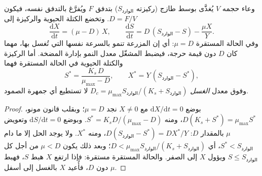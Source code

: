 \begin{theorem}\label{thm:b2:microbial-metabolism:chemostat}
\emph{} وعاء حجمه $V$ يُغذَّى بوسط طازج
(ركيزته $S_{\text{الوارد}}$) بتدفق $F$ ويُفرَّغ بالتدفق نفسه، فيكون
\emph{} $D = F/V$. وتخضع الكتلة الحيوية والركيزة إلى
\[
\frac{\mathrm{d}X}{\mathrm{d}t} = (\mu - D)\,X, \qquad
\frac{\mathrm{d}S}{\mathrm{d}t} = D\,(S_{\text{الوارد}} - S) - \frac{\mu X}{Y}.
\]
وفي الحالة المستقرة $\mu = D$: أي إن المزرعة تنمو بالسرعة نفسها
التي تُغسل بها، مهما كان $D$ دون قيمة حرجة، فيضبط المشغّل معدل
النمو بإدارة المضخة. أما الركيزة والكتلة الحيوية في الحالة
المستقرة فهما
\[
S^* = \frac{K_s\,D}{\mu_{\max} - D}, \qquad X^* = Y\,(S_{\text{الوارد}} - S^*),
\]
وفوق معدل \emph{الغسل} $D_c = \mu_{\max}
S_{\text{الوارد}}/(K_s + S_{\text{الوارد}})$ لا تستطيع أي جمهرة الصمود.
\end{theorem}
\begin{proof}
بوضع $\mathrm{d}X/\mathrm{d}t = 0$ مع $X \neq 0$ نجد $\mu = D$؛
وبقلب قانون مونو، $D(K_s + S^*) = \mu_{\max} S^*$، ومنه $S^* =
K_s D/(\mu_{\max} - D)$. وبوضع $\mathrm{d}S/\mathrm{d}t = 0$
وتعويض $\mu$ بالمقدار $D$: $D(S_{\text{الوارد}} - S^*) = DX^*/Y$، ومنه
$X^*$. ولا يوجد الحل إلا ما دام $S^* < S_{\text{الوارد}}$، أي
$D < \mu_{\max} S_{\text{الوارد}}/(K_s + S_{\text{الوارد}})$؛ وبعد ذلك
يكون $\mu < D$ من أجل كل $S \le S_{\text{الوارد}}$ ويؤول $X$ إلى الصفر.
والحالة المستقرة مستقرة: فإذا ارتفع $X$ هبط $S$، فهبط $\mu$ دون
$D$، فأُعيد $X$ بالغسل إلى أسفل.
\end{proof}

